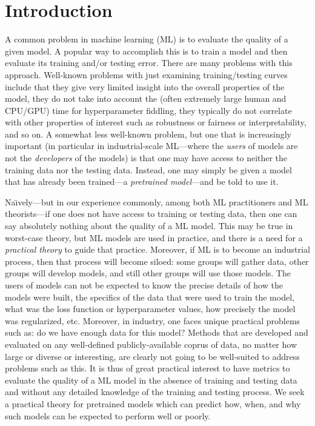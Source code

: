 
\section{Introduction}
\label{sxn:intro}

A common problem in machine learning (ML) 
is to evaluate the quality of a given model.
A popular way to accomplish this
is to train a model and then evaluate its training and/or testing error.
There are many problems with this approach.
Well-known problems with just examining training/testing curves include that 
they give very limited insight into the overall properties of the model, 
they do not take into account the (often extremely large human and CPU/GPU) time for hyperparameter fiddling,
they typically do not correlate with other properties of interest such as robustness or fairness or interpretability, 
and so on.
A somewhat less well-known problem, but one that is increasingly important (in particular in industrial-scale ML---where the \emph{users} of models are not the \emph{developers} of the models) is that one may have access to neither the training data nor the testing data.
Instead, one may simply be given a model that has already been trained---a \emph{pretrained model}---and be told to use it.

Na\"{\i}vely---but in our experience commonly, among both ML practitioners and ML theorists---if one does not have access to training or testing data, then one can say absolutely nothing about the quality of a ML model.
This may be true in worst-case theory, but ML models are used in practice, and there is a need for a \emph{practical theory} to guide that practice.
Moreover, if ML is to become an industrial process, then that process will become siloed: some groups will gather data, other groups will develop models, and still other groups will use those models.
The users of models can not be expected to know the precise details of how the models were built, the specifics of the data that were used to train the model, what was the loss function or hyperparameter values, how precisely the model was regularized, etc.
%
Moreover, in industry, one faces unique practical problems such as: do we have enough data for this model? 
Methods that are developed and evaluated on any well-defined publicly-available coprus of data, no matter how large or diverse or interesting, are clearly not going to be well-suited to address problems such as this.
It is thus of great practical interest to have metrics to evaluate the quality of a ML model in the absence of training and testing data and without any detailed knowledge of the training and testing process.  
We seek a practical theory for pretrained models which can predict how, when, and why such models can be expected to perform well or poorly.

